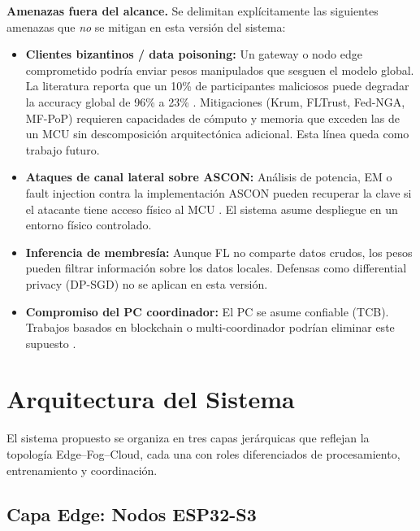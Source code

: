 \noindent\textbf{Amenazas fuera del alcance.} Se delimitan explícitamente las siguientes amenazas que \emph{no} se mitigan en esta versión del sistema:

\begin{itemize}[noitemsep, topsep=0pt]
    \item \textbf{Clientes bizantinos / data poisoning:} Un gateway o nodo edge comprometido podría enviar pesos manipulados que sesguen el modelo global. La literatura reporta que un 10\% de participantes maliciosos puede degradar la accuracy global de 96\% a 23\% \cite{Tran2026_EdgeTrustShard}. Mitigaciones (Krum, FLTrust, Fed-NGA, MF-PoP) requieren capacidades de cómputo y memoria que exceden las de un MCU sin descomposición arquitectónica adicional. Esta línea queda como trabajo futuro.
    \item \textbf{Ataques de canal lateral sobre ASCON:} Análisis de potencia, EM o fault injection contra la implementación ASCON pueden recuperar la clave si el atacante tiene acceso físico al MCU \cite{Kaur2025_ASCON_Survey}. El sistema asume despliegue en un entorno físico controlado.
    \item \textbf{Inferencia de membresía:} Aunque FL no comparte datos crudos, los pesos pueden filtrar información sobre los datos locales. Defensas como differential privacy (DP-SGD) no se aplican en esta versión.
    \item \textbf{Compromiso del PC coordinador:} El PC se asume confiable (TCB). Trabajos basados en blockchain o multi-coordinador podrían eliminar este supuesto \cite{Tran2026_EdgeTrustShard}.
\end{itemize}


\section{Arquitectura del Sistema}
\label{sec:arquitectura}

El sistema propuesto se organiza en tres capas jerárquicas que reflejan la topología Edge--Fog--Cloud, cada una con roles diferenciados de procesamiento, entrenamiento y coordinación.

\subsection{Capa Edge: Nodos ESP32-S3}

